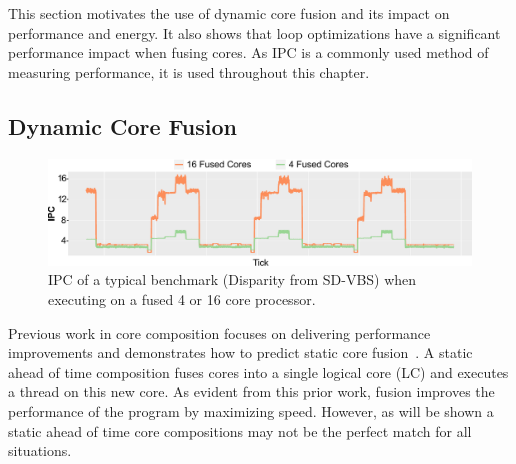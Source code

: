 This section motivates the use of dynamic core fusion and its impact on performance and energy.
It also shows that loop optimizations have a significant performance impact when fusing cores.
As IPC is a commonly used method of measuring performance, it is used throughout this chapter.

\subsection{Dynamic Core Fusion}
\begin{figure}[t]
    \centering
    \includegraphics[width=\textwidth]{cases-paper/graphics/motivation/disp_opt_4_16_3.pdf}
    \caption{IPC of a typical benchmark (Disparity from SD-VBS) when executing on a fused 4 or 16 core processor.} 
    \label{fig:disp_ex}
\end{figure}





Previous work in core composition focuses on delivering performance improvements \cite{ipek2007CoreFusion,kim2007tflex} and demonstrates how to predict static core fusion~\cite{micolet2016dmpstream}.
A static ahead of time composition fuses cores into a single logical core (LC) and executes a thread on this new core.
As evident from this prior work, fusion improves the performance of the program by maximizing speed.
However, as will be shown a static ahead of time core compositions may not be the perfect match for all situations.

